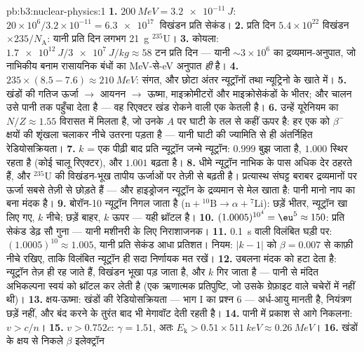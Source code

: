 \begin{solution}{pb:b3:nuclear-physics:1}
\textbf{1.} $\qty{200}{MeV} = \qty{3.2e-11}{J}$:
$20\times10^6/3.2\times10^{-11} = \qty{6.3e17}{}$ विखंडन प्रति
सेकंड।
\textbf{2.} प्रति दिन $5.4\times10^{22}$ विखंडन $\times
235/N_{\text{A}}$: यानी प्रति दिन लगभग \qty{21}{g} $^{235}$U।
\textbf{3.} कोयला: $\qty{1.7e12}{J}/\qty{3e7}{J/kg} \approx 58$
टन प्रति दिन --- यानी $\sim3\times10^{6}$ का द्रव्यमान-अनुपात, जो
नाभिकीय बनाम रासायनिक बंधों का \unit{MeV}-से-\unit{eV} अनुपात
\emph{ही} है।
\textbf{4.} $235\times(8.5 - 7.6) \approx \qty{210}{MeV}$:
संगत, और छोटा अंतर न्यूट्रॉनों तथा न्यूट्रिनो के खाते में।
\textbf{5.} खंडों की गतिज ऊर्जा $\to$ आयनन $\to$ ऊष्मा,
माइक्रोमीटरों और माइक्रोसेकंडों के भीतर; और चालन उसे पानी तक पहुँचा
देता है --- वह रिएक्टर खंड रोकने वाली एक केतली है।
\textbf{6.} उन्हें यूरेनियम का $N/Z \approx 1.55$ विरासत में मिलता
है, जो उनके $A$ पर घाटी के तल से कहीं ऊपर है: हर एक को
$\beta^-$ क्षयों की शृंखला चलाकर नीचे उतरना पड़ता है --- यानी घाटी की
ज्यामिति से ही अंतर्निहित रेडियोसक्रियता।
\textbf{7.} $k$ = एक पीढ़ी बाद प्रति न्यूट्रॉन जन्मे न्यूट्रॉन:
$0.999$ बुझ जाता है, $1.000$ स्थिर रहता है (कोई चालू
रिएक्टर), और $1.001$ बढ़ता है।
\textbf{8.} धीमे न्यूट्रॉन नाभिक के पास अधिक देर ठहरते हैं, और
$^{235}$U की विखंडन-भूख तापीय ऊर्जाओं पर तेज़ी से बढ़ती है।
प्रत्यास्थ संघट्ट बराबर द्रव्यमानों पर ऊर्जा सबसे तेज़ी से छोड़ते हैं
--- और हाइड्रोजन न्यूट्रॉन के द्रव्यमान से मेल खाता है: पानी
मानो नाप का बना मंदक है।
\textbf{9.} बोरॉन-10 न्यूट्रॉन निगल जाता है ($\text{n} + {}^{10}
\text{B} \to \alpha + {}^{7}\text{Li}$): छड़ें भीतर, न्यूट्रॉन
खा लिए गए, $k$ नीचे; छड़ें बाहर, $k$ ऊपर --- यही थ्रॉटल है।
\textbf{10.} $(1.0005)^{10^4} = \eu^{5} \approx 150$: प्रति सेकंड
डेढ़ सौ गुना --- यानी मशीनरी के लिए निराशाजनक।
\textbf{11.} \qty{0.1}{s} वाली विलंबित घड़ी पर:
$(1.0005)^{10} \approx 1.005$, यानी प्रति सेकंड आधा प्रतिशत। नियम:
$|k - 1|$ को $\beta = 0.007$ से काफ़ी नीचे रखिए, ताकि विलंबित
न्यूट्रॉन ही सदा निर्णायक मत रखें।
\textbf{12.} उबलना मंदक को हटा देता है: न्यूट्रॉन तेज़ ही रह जाते
हैं, विखंडन भूखा पड़ जाता है, और $k$ गिर जाता है --- पानी से मंदित
अभिकल्पना स्वयं को थ्रॉटल कर लेती है (एक ऋणात्मक प्रतिपुष्टि, जो
उसके ग्रेफ़ाइट वाले चचेरों में नहीं थी)।
\textbf{13.} क्षय-ऊष्मा: खंडों की रेडियोसक्रियता ---
भाग I का प्रश्न 6 --- अर्ध-आयु मानती है, नियंत्रण छड़ें नहीं, और
बंद करने के तुरंत बाद भी मेगावॉट देती रहती है।
\textbf{14.} पानी में प्रकाश से आगे निकलना: $v > c/n$।
\textbf{15.} $v > 0.752c$: $\gamma = 1.51$, अतः $E_{\text{k}} >
0.51\times\qty{511}{keV} \approx \qty{0.26}{MeV}$।
\textbf{16.} खंडों के क्षय से निकले $\beta$ इलेक्ट्रॉन

\end{solution}
